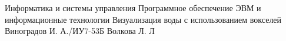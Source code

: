 \documentclass{bmstu}
\begin{document}
\renewcommand{\thelstlisting}{\arabic{lstlisting}}

\makecourseworktitle
    {Информатика и системы управления}
    {Программное обеспечение ЭВМ и информационные технологии}
    {Визуализация воды с использованием вокселей}
    {Виноградов И. А./ИУ7-53Б} 
    {Волкова Л. Л} 
    {} 

\maketableofcontents








\makebibliography
\end{document}
